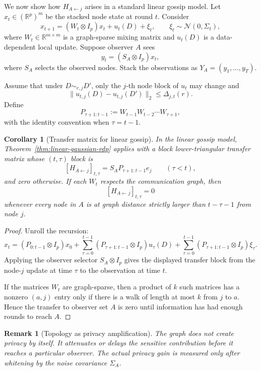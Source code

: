 \documentclass[conference,compsoc]{IEEEtran}
\newtheorem{corollary}{Corollary}
\newtheorem{remark}{Remark}
\newcommand{\R}{\mathbb{R}}
\newcommand{\N}{\mathcal{N}}
\begin{document}
We now show how $H_{A\leftarrow j}$ arises in a standard linear gossip model. Let $x_t\in(\R^p)^m$ be the stacked node state at round $t$. Consider
\[
x_{t+1}=(W_t\otimes I_p)x_t+u_t(D)+\xi_t,
\qquad
\xi_t\sim\N(0,\Sigma_t),
\]
where $W_t\in\R^{m\times m}$ is a graph-sparse mixing matrix and $u_t(D)$ is a data-dependent local update. Suppose observer $A$ sees
\[
y_t=(S_A\otimes I_p)x_t,
\]
where $S_A$ selects the observed nodes. Stack the observations as $Y_A=(y_1,\ldots,y_T)$.

Assume that under $D\sim_{r,j}D'$, only the $j$-th node block of $u_t$ may change and
\[
\|u_{t,j}(D)-u_{t,j}(D')\|_2\le\Delta_{j,t}(r).
\]
Define
\[
P_{\tau+1:t-1}:=W_{t-1}W_{t-2}\cdots W_{\tau+1},
\]
with the identity convention when $\tau=t-1$.

\begin{corollary}[Transfer matrix for linear gossip]
\label{cor:gossip-transfer}
In the linear gossip model, Theorem~\ref{thm:linear-gaussian-rdp} applies with a block lower-triangular transfer matrix whose $(t,\tau)$ block is
\[
[H_{A\leftarrow j}]_{t,\tau}
=
S_A P_{\tau+1:t-1}e_j
\qquad(\tau<t),
\]
and zero otherwise. If each $W_t$ respects the communication graph, then
\[
[H_{A\leftarrow j}]_{t,\tau}=0
\]
whenever every node in $A$ is at graph distance strictly larger than $t-\tau-1$ from node $j$.
\end{corollary}

\begin{proof}
Unroll the recursion:
\[
x_t=(P_{0:t-1}\otimes I_p)x_0
+
\sum_{\tau=0}^{t-1}(P_{\tau+1:t-1}\otimes I_p)u_\tau(D)
+
\sum_{\tau=0}^{t-1}(P_{\tau+1:t-1}\otimes I_p)\xi_\tau.
\]
Applying the observer selector $S_A\otimes I_p$ gives the displayed transfer block from the node-$j$ update at time $\tau$ to the observation at time $t$.

If the matrices $W_t$ are graph-sparse, then a product of $k$ such matrices has a nonzero $(a,j)$ entry only if there is a walk of length at most $k$ from $j$ to $a$. Hence the transfer to observer set $A$ is zero until information has had enough rounds to reach $A$.
\end{proof}

\begin{remark}[Topology as privacy amplification]
The graph does not create privacy by itself. It attenuates or delays the sensitive contribution before it reaches a particular observer. The actual privacy gain is measured only after whitening by the noise covariance $\Sigma_A$.
\end{remark}
\end{document}
